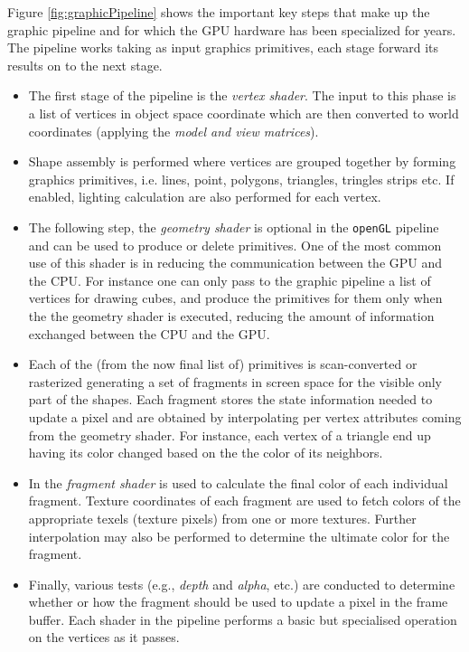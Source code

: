 \begin{description}
     Figure \ref{fig:graphicPipeline} shows the important key steps that make up the graphic pipeline and for which the GPU hardware has been specialized for years. The pipeline works taking as input graphics primitives, each stage forward its results on to the next stage.
    \begin{itemize}
    	\item     The first stage of the pipeline is the \textit{vertex shader}. The
    	input to this phase is a list of vertices in object space coordinate which are then converted to world coordinates (applying the \textit{model and view matrices}).
    	\item  Shape assembly is performed where vertices are grouped together by forming graphics primitives, i.e. lines, point, polygons, triangles, tringles strips etc. If enabled, lighting calculation are also performed for each vertex.
    	\item   The following step, the \textit{geometry shader} is optional in the \texttt{openGL} pipeline and can be used to produce or delete primitives. One of the most common use of this shader is in reducing the communication between the GPU and the CPU. For instance one can only pass to the graphic pipeline a list of vertices for drawing cubes, and produce the primitives for them only when the the geometry shader is executed, reducing the amount of information exchanged between the CPU and the GPU.
    	\item   Each of the (from the now final list of) primitives is scan-converted or rasterized generating a set of fragments in screen space for the visible only part of the shapes. Each fragment stores the state information needed to update a pixel and are obtained by interpolating per vertex attributes coming from the geometry shader. For instance, each vertex of a triangle end up having its color changed based on the the color of its neighbors. 
    	\item  In the \textit{fragment  shader} is used to calculate the final color of each individual fragment. Texture coordinates of each fragment are used to fetch colors of the appropriate texels (texture pixels) from
    	one or more textures. Further interpolation may also be
    	performed to determine the ultimate color for the fragment.
    	\item Finally, various tests (e.g., \textit{depth} and \textit{alpha}, etc.) are conducted to determine whether or how the fragment should be used to update a pixel in the frame buffer.    
    	Each shader in the pipeline performs a basic but specialised operation on the
    	vertices as it passes. 
    \end{itemize}


\end{description}
